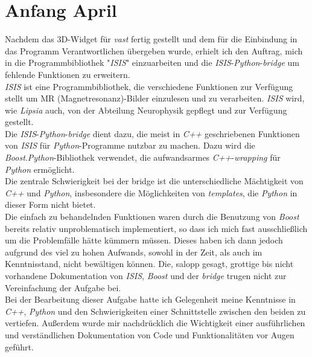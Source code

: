 \documentclass[a4paper,10pt]{article}
\begin{document}
\section{Anfang April}
Nachdem das 3D-Widget für \emph{vast} fertig gestellt und dem für die Einbindung in das Programm Verantwortlichen übergeben wurde, erhielt ich den Auftrag, mich in die Programmbibliothek "\emph{ISIS}" einzuarbeiten und die \emph{ISIS}-\emph{Python}-\emph{bridge} um fehlende Funktionen zu erweitern.\\
\emph{ISIS} ist eine Programmbibliothek, die verschiedene Funktionen zur Verfügung stellt um MR (Magnetresonanz)-Bilder einzulesen und zu verarbeiten. \emph{ISIS} wird, wie \emph{Lipsia} auch, von der Abteilung Neurophysik gepflegt und zur Verfügung gestellt.\\
Die \emph{ISIS}-\emph{Python}-\emph{bridge} dient dazu, die meist in \emph{C++} geschriebenen Funktionen von \emph{ISIS} für \emph{Python}-Programme nutzbar zu machen. Dazu wird die \emph{Boost}.\emph{Python}-Bibliothek verwendet, die  aufwandsarmes \emph{C++}-\emph{wrapping} für \emph{Python} ermöglicht.\\
Die zentrale Schwierigkeit bei der bridge ist die unterschiedliche Mächtigkeit von \emph{C++} und \emph{Python}, insbesondere die Möglichkeiten von \emph{templates}, die \emph{Python} in dieser Form nicht bietet.\\ 
Die einfach zu behandelnden Funktionen waren durch die Benutzung von \emph{Boost} bereits relativ unproblematisch implementiert, so dass ich mich fast ausschließlich um die Problemfälle hätte kümmern müssen. Dieses haben ich dann jedoch aufgrund des viel zu hohen Aufwands, sowohl in der Zeit, als auch im Kenntnisstand, nicht bewältigen können. Die, salopp gesagt, grottige bis nicht vorhandene Dokumentation von \emph{ISIS}, \emph{Boost} und der \emph{bridge} trugen nicht zur Vereinfachung der Aufgabe bei.\\
Bei der Bearbeitung dieser Aufgabe hatte ich Gelegenheit meine Kenntnisse in \emph{C++}, \emph{Python} und den Schwierigkeiten einer Schnittstelle zwischen den beiden zu vertiefen. Außerdem wurde mir nachdrücklich die Wichtigkeit einer ausführlichen und verständlichen Dokumentation von Code und Funktionalitäten vor Augen geführt.\\
\end{document}

